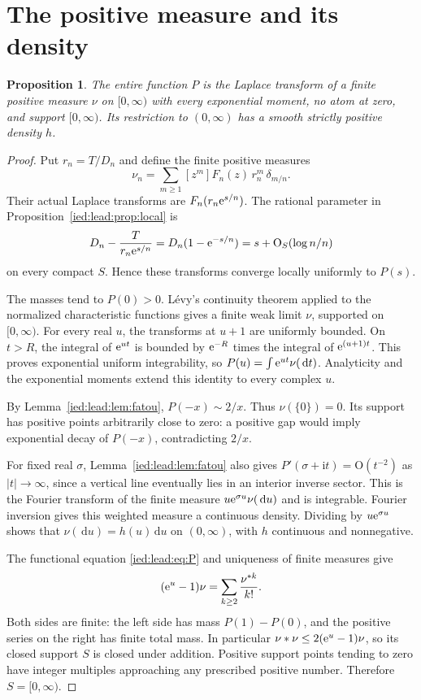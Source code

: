 \documentclass[11pt,letterpaper]{article}
\newtheorem{proposition}[theorem]{Proposition}
\theoremstyle{remark}\newtheorem{remark}[theorem]{Remark}
\newcommand{\ii}{\mathrm i}\newcommand{\dd}{\,\mathrm d}
\newcommand{\Oh}{\mathrm O}\newcommand{\supp}{\operatorname{supp}}
\begin{document}
\section{The positive measure and its density}\label{ied:lead:sec:measure}
\begin{proposition}\label{ied:lead:prop:measure}
The entire function $P$ is the Laplace transform of a finite positive measure $\nu$ on $[0,\infty)$ with every exponential moment, no atom at zero, and support $[0,\infty)$. Its restriction to $(0,\infty)$ has a smooth strictly positive density $h$.
\end{proposition}
\begin{proof}
Put $r_n=T/D_n$ and define the finite positive measures
\[
 \nu_n=\sum_{m\ge1}[z^m]F_n(z)\,r_n^m\,\delta_{m/n}.
\]
Their actual Laplace transforms are $F_n(r_n\mathrm e^{s/n})$. The rational parameter in Proposition~\ref{ied:lead:prop:local} is
\[
 D_n-\frac{T}{r_n\e^{s/n}}
 =D_n(1-\e^{-s/n})=s+\Oh_S(\log n/n)
\]
on every compact $S$. Hence these transforms converge locally uniformly to $P(s)$.

The masses tend to $P(0)>0$. L\'evy's continuity theorem applied to the normalized characteristic functions gives a finite weak limit $\nu$, supported on $[0,\infty)$. For every real $u$, the transforms at $u+1$ are uniformly bounded. On $t>R$, the integral of $\mathrm e^{ut}$ is bounded by $\mathrm e^{-R}$ times the integral of $\mathrm e^{(u+1)t}$. This proves exponential uniform integrability, so $P(u)=\int\e^{ut}\nu(\dd t)$. Analyticity and the exponential moments extend this identity to every complex $u$.

By Lemma~\ref{ied:lead:lem:fatou}, $P(-x)\sim2/x$. Thus $\nu(\{0\})=0$. Its support has positive points arbitrarily close to zero: a positive gap would imply exponential decay of $P(-x)$, contradicting $2/x$.

For fixed real $\sigma$, Lemma~\ref{ied:lead:lem:fatou} also gives
$P'(\sigma+\ii t)=\Oh(t^{-2})$ as $|t|\to\infty$, since a vertical line eventually lies in an interior inverse sector. This is the Fourier transform of the finite measure $u\e^{\sigma u}\nu(\dd u)$ and is integrable. Fourier inversion gives this weighted measure a continuous density. Dividing by $u\mathrm e^{\sigma u}$ shows that $\nu(\dd u)=h(u)\dd u$ on $(0,\infty)$, with $h$ continuous and nonnegative.

The functional equation \eqref{ied:lead:eq:P} and uniqueness of finite measures give
\begin{equation}\label{ied:lead:eq:measureidentity}
 (\mathrm e^u-1)\nu=\sum_{k\ge2}\frac{\nu^{*k}}{k!}.
\end{equation}
Both sides are finite: the left side has mass $P(1)-P(0)$, and the positive series on the right has finite total mass. In particular $\nu*\nu\le2(\mathrm e^u-1)\nu$, so its closed support $S$ is closed under addition. Positive support points tending to zero have integer multiples approaching any prescribed positive number. Therefore $S=[0,\infty)$.


\end{proof}
\end{document}
